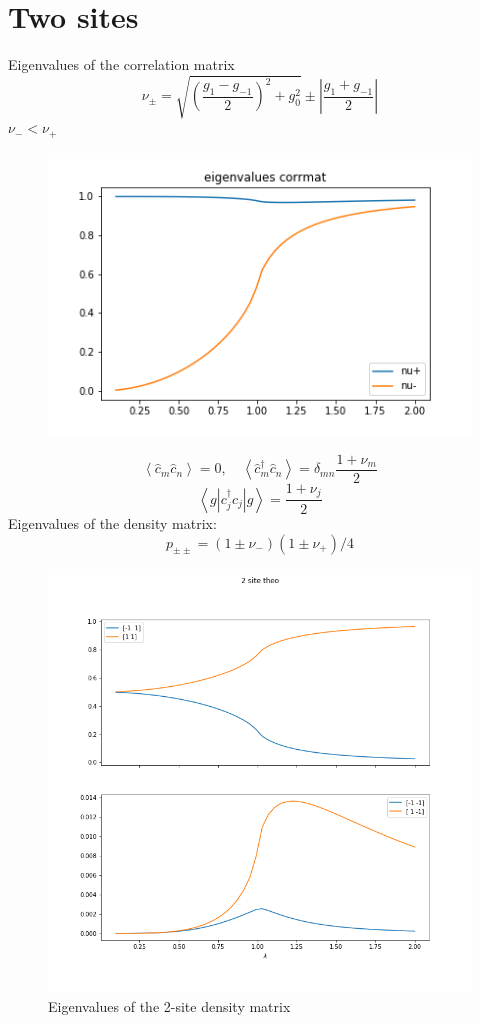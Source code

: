 \documentclass[10pt,a4paper]{article}
\begin{document}
\section{Two sites}

Eigenvalues of the correlation matrix
\begin{equation}
	\nu_{\pm}=\sqrt{\left(\frac{g_{1}-g_{-1}}{2}\right)^{2}+g_{0}^{2}} \pm \left| \frac{g_{1}+g_{-1}}{2} \right|
\end{equation}
$\nu_-<\nu_+$\\
\begin{figure}[h]
	\centering
	\includegraphics[width=0.7\linewidth]{nuplot}
	\caption{}
	\label{fig:nuplot}
\end{figure}
\begin{equation}
	\left\langle\hat{c}_{m} \hat{c}_{n}\right\rangle=0, \quad\left\langle\hat{c}_{m}^{\dagger} \hat{c}_{n}\right\rangle=\delta_{m n} \frac{1+\nu_{m}}{2}
\end{equation}
\begin{equation}
	\left\langle g\left|c_{j}^{\dagger} c_{j}\right| g\right\rangle=\frac{1+\nu_{j}}{2}
\end{equation}
Eigenvalues of the density matrix:
\begin{equation}
	p_{\pm \pm } =(1 \pm \nu_-)(1 \pm \nu_+)/4
\end{equation}
\begin{figure}[h]
	\centering
	\includegraphics[width=0.7\linewidth]{two_site_theo}
	\caption{Eigenvalues of the 2-site density matrix}
	\label{fig:twositetheo}
\end{figure}
\end{document}
